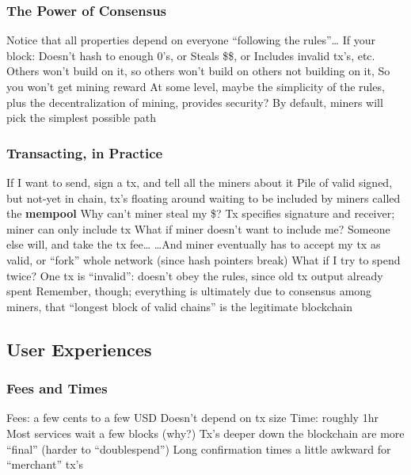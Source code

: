 \documentclass[aspectratio=169]{beamer}
\begin{document}
\begin{frame}
\frametitle{The Power of Consensus}

\bi
\m Notice that all properties depend on everyone ``following the rules''\ldots
\bi
\m If your block:
\bi
\m Doesn't hash to enough 0's, or
\m Steals \$\$, or
\m Includes invalid tx's, etc.
\ei
\m Others won't build on it, so others won't build on others not building on it, 
\m So you won't get mining reward
\ei
\m At some level, maybe the simplicity of the rules, plus the decentralization of mining, provides security?
\bi
\m By default, miners will pick the simplest possible path
\ei
\ei

\end{frame}

\begin{frame}
\frametitle{Transacting, in Practice}

\bi
\m If I want to send, sign a tx, and tell all the miners about it \pause
\bi
\m Pile of valid signed, but not-yet in chain, tx's floating around waiting to be included by miners called the \textbf{mempool}
\ei \pause
\m Why can't miner steal my \$? \pause
\bi
\m Tx specifies signature and receiver; miner can only include tx
\ei
\m What if miner doesn't want to include me? \pause
\bi
\m Someone else will, and take the tx fee\ldots
\m \ldots And miner eventually has to accept my tx as valid, or ``fork'' whole network (since hash pointers break)
\ei \pause
\m What if I try to spend twice? \pause
\bi
\m One tx is ``invalid'': doesn't obey the rules, since old tx output already spent
\m Remember, though; everything is ultimately due to consensus among miners, that ``longest block of valid chains'' is the legitimate blockchain
\ei
\ei

\end{frame}

\subsection{User Experiences}

\begin{frame}
\frametitle{Fees and Times}

\bi
\m Fees: a few cents to a few USD
\bi
\m Doesn't depend on tx size 
\ei
\m Time: roughly 1hr
\bi
\m Most services wait a few blocks (why?) \pause
\m Tx's deeper down the blockchain are more ``final'' (harder to ``doublespend'')
\ei
\m Long confirmation times a little awkward for ``merchant'' tx's
\ei

\end{frame}
\end{document}
